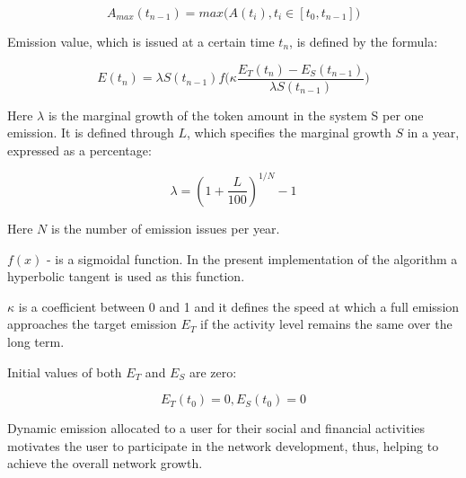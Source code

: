 \documentclass[a4paper,12pt]{article}
\begin{document}
$$
    A_{max}(t_{n-1}) = max \Big ( A(t_i), t_i \in [t_0, t_{n-1}] \Big )
$$

Emission value, which is issued at a certain time $t_n$, is defined by the formula:



$$
    E(t_n) = \lambda S(t_{n-1}) f \Big( \kappa \frac {E_T(t_n) - E_S(t_{n-1})}{\lambda S(t_{n-1})} \Big)
$$

Here $\lambda$ is the marginal growth of the token amount in the system S per one emission. It is defined through $L$, which specifies the marginal growth $S$ in a year, expressed as a percentage:



$$
    \lambda = (1 + \frac{L}{100})^{1/N}-1
$$

Here $N$ is the number of emission issues per year.



$f(x)$ - is a sigmoidal function. In the present implementation of the algorithm a hyperbolic tangent is used as this function. 


$\kappa$ is a coefficient between 0 and 1 and it defines the speed at which a full emission approaches the target emission $E_T$ if the activity level remains the same over the long term.



Initial values of both $E_T$ and $E_S$ are zero:



$$
E_T(t_0)=0, E_S(t_0)=0
$$



Dynamic emission allocated to a user for their social and financial activities motivates the user to participate in the network development, thus, helping to achieve the overall network growth.

%
%
\end{document}
